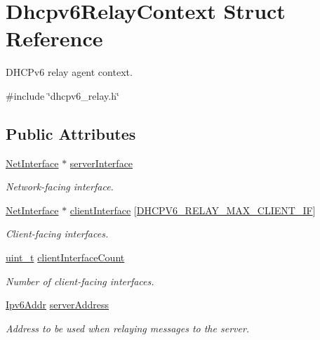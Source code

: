 \hypertarget{structDhcpv6RelayContext}{}\section{Dhcpv6\+Relay\+Context Struct Reference}
\label{structDhcpv6RelayContext}


D\+H\+C\+Pv6 relay agent context.  




{\ttfamily \#include \char`\"{}dhcpv6\+\_\+relay.\+h\char`\"{}}

\subsection*{Public Attributes}
\begin{DoxyCompactItemize}
\item 
\hyperlink{net_8h_a2234db8911a1148c9159979d8f5e0d6b}{Net\+Interface} $\ast$ \hyperlink{structDhcpv6RelayContext_ac4e2670737b844e0484e24a13d01d914}{server\+Interface}
\begin{DoxyCompactList}\small\item\em Network-\/facing interface. \end{DoxyCompactList}\item 
\hyperlink{net_8h_a2234db8911a1148c9159979d8f5e0d6b}{Net\+Interface} $\ast$ \hyperlink{structDhcpv6RelayContext_a3781192d09173701e63dcbbb721fe630}{client\+Interface} \mbox{[}\hyperlink{dhcpv6__relay_8h_a588f9db9b4638a3b196e1421ab1bf6dc}{D\+H\+C\+P\+V6\+\_\+\+R\+E\+L\+A\+Y\+\_\+\+M\+A\+X\+\_\+\+C\+L\+I\+E\+N\+T\+\_\+\+IF}\mbox{]}
\begin{DoxyCompactList}\small\item\em Client-\/facing interfaces. \end{DoxyCompactList}\item 
\hyperlink{compiler__port_8h_a12a1e9b3ce141648783a82445d02b58d}{uint\+\_\+t} \hyperlink{structDhcpv6RelayContext_a2f2b799fb5c66e195d8cea084afc1116}{client\+Interface\+Count}
\begin{DoxyCompactList}\small\item\em Number of client-\/facing interfaces. \end{DoxyCompactList}\item 
\hyperlink{ipv6_8h_aed0cbc40c61ed5b4fb681ebc55237e89}{Ipv6\+Addr} \hyperlink{structDhcpv6RelayContext_af99b4fbe7d100b5356cd7aa2c587eda4}{server\+Address}
\begin{DoxyCompactList}\small\item\em Address to be used when relaying messages to the server. \end{DoxyCompactList}\item 

\end{DoxyCompactItemize}

